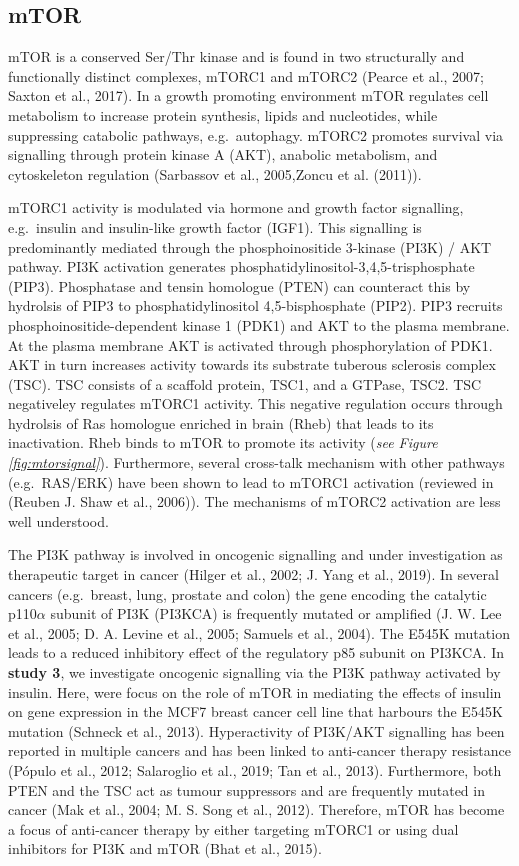 \documentclass[12pt,openany]{book}
\begin{document}
\subsection{mTOR} \label{mTOR}

mTOR is a conserved Ser/Thr kinase and is found in two structurally and
functionally distinct complexes, mTORC1 and mTORC2 (Pearce et al., 2007;
Saxton et al., 2017). In a growth promoting environment mTOR regulates
cell metabolism to increase protein synthesis, lipids and nucleotides,
while suppressing catabolic pathways, e.g.~autophagy. mTORC2 promotes
survival via signalling through protein kinase A (AKT), anabolic
metabolism, and cytoskeleton regulation (Sarbassov et al., 2005,Zoncu et
al. (2011)).

mTORC1 activity is modulated via hormone and growth factor signalling,
e.g.~insulin and insulin-like growth factor (IGF1). This signalling is
predominantly mediated through the phosphoinositide 3-kinase (PI3K) /
AKT pathway. PI3K activation generates
phosphatidylinositol-3,4,5-trisphosphate (PIP3). Phosphatase and tensin
homologue (PTEN) can counteract this by hydrolsis of PIP3 to
phosphatidylinositol 4,5-bisphosphate (PIP2). PIP3 recruits
phosphoinositide-dependent kinase 1 (PDK1) and AKT to the plasma
membrane. At the plasma membrane AKT is activated through
phosphorylation of PDK1. AKT in turn increases activity towards its
substrate tuberous sclerosis complex (TSC). TSC consists of a scaffold
protein, TSC1, and a GTPase, TSC2. TSC negativeley regulates mTORC1
activity. This negative regulation occurs through hydrolsis of Ras
homologue enriched in brain (Rheb) that leads to its inactivation. Rheb
binds to mTOR to promote its activity (\emph{see Figure
\ref{fig:mtorsignal}}). Furthermore, several cross-talk mechanism with
other pathways (e.g.~RAS/ERK) have been shown to lead to mTORC1
activation (reviewed in (Reuben J. Shaw et al., 2006)). The mechanisms
of mTORC2 activation are less well understood.

The PI3K pathway is involved in oncogenic signalling and under
investigation as therapeutic target in cancer (Hilger et al., 2002; J.
Yang et al., 2019). In several cancers (e.g.~breast, lung, prostate and
colon) the gene encoding the catalytic p110\(\alpha\) subunit of PI3K
(PI3KCA) is frequently mutated or amplified (J. W. Lee et al., 2005; D.
A. Levine et al., 2005; Samuels et al., 2004). The E545K mutation leads
to a reduced inhibitory effect of the regulatory p85 subunit on PI3KCA.
In \textbf{study 3}, we investigate oncogenic signalling via the PI3K
pathway activated by insulin. Here, were focus on the role of mTOR in
mediating the effects of insulin on gene expression in the MCF7 breast
cancer cell line that harbours the E545K mutation (Schneck et al.,
2013). Hyperactivity of PI3K/AKT signalling has been reported in
multiple cancers and has been linked to anti-cancer therapy resistance
(Pópulo et al., 2012; Salaroglio et al., 2019; Tan et al., 2013).
Furthermore, both PTEN and the TSC act as tumour suppressors and are
frequently mutated in cancer (Mak et al., 2004; M. S. Song et al.,
2012). Therefore, mTOR has become a focus of anti-cancer therapy by
either targeting mTORC1 or using dual inhibitors for PI3K and mTOR (Bhat
et al., 2015). \clearpage
\end{document}
